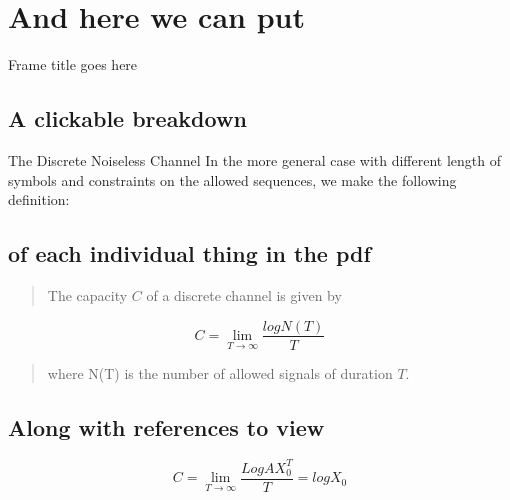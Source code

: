 \documentclass[nocontents]{beamer}
\title{}
\author{Jane Doe}
\begin{document}
\maketitle
\section{And here we can put}
\begin{frame}[t]{Frame title goes here}
  \subsection{A clickable breakdown}
  \begin{exampleblock}{The Discrete Noiseless Channel}
    In the more general case with different length of symbols and constraints on the allowed sequences, we make the following definition:
    \subsection{of each individual thing in the pdf}
    \begin{quote}
      The capacity $C$ of a discrete channel is given by
    \end{quote}
    \[ C = \lim_{T \to \infty}  \frac{logN(T)}{T}\]

    \begin{quote}
    where N(T) is the number of allowed signals of duration $T$.
  \end{quote}
\end{exampleblock}
\subsection{Along with references to view}
  \begin{theorem}
    \[C = \lim_{T \to \infty}\frac{LogAX^{T}_{0}}{T} = logX_{0}\]
  \end{theorem}
\end{frame}
\end{document}
